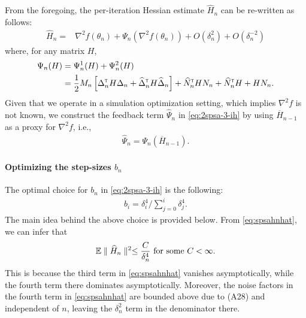 From the foregoing, the per-iteration Hessian estimate $\widehat H_n$ can be re-written as follows:
\begin{align}
\widehat H_n = & \nabla^2 f(\theta_n) + \Psi_{n}(\nabla^2 f(\theta_n)) +  O(\delta_n^2) + O(\delta_n^{-2})  \label{eq:spsahnhat}
\end{align}
where, for any matrix $H$, 
\begin{align}
\Psi_{n}(H) &=  \Psi_{n}^{1}(H) + \Psi_{n}^{2}(H)\nonumber\\
&=  \frac{1}{2}M_n \left[\Delta_n^\mathsf{\scriptscriptstyle T} H \Delta_n + \widehat\Delta_n^\mathsf{\scriptscriptstyle T} H \widehat\Delta_n\right] + \widehat N_n^\mathsf{\scriptscriptstyle T} H N_n + \widehat N_n^\mathsf{\scriptscriptstyle T} H + H N_n.\label{eq:spsapsi}
\end{align}
Given that we operate in a simulation optimization setting, which implies $\nabla^2 f$ is not known, we construct the feedback term $\widehat \Psi_n$ in \eqref{eq:2spsa-3-ih} by using $\overline H_{n-1}$ as a proxy for $\nabla^2 f$, i.e.,
\begin{align}
\widehat \Psi_n = \Psi_{n} (\overline H_{n-1}).
\label{eq:psinhatspsa3}
\end{align}

\paragraph{\textbf{Optimizing the step-sizes }$b_n$}

The optimal choice for $b_n$ in \eqref{eq:2spsa-3-ih}  is the following:
\begin{align}
\label{eq:spsawieghts}
b_i  = \delta_i^{4}/\sum\limits_{j=0}^{i} \delta_j^{4}.
\end{align}
The main idea behind the above choice is provided below.
From \eqref{eq:spsahnhat}, we can infer that
\begin{align*}
\mathbb{E} \parallel \widehat H_n \parallel^2 \le \dfrac{C}{\delta_n^4} \text{ for some } C<\infty. 
\end{align*} 
This is because the third term in \eqref{eq:spsahnhat} vanishes asymptotically, while the fourth term there dominates asymptotically. Moreover, the noise factors in the fourth term in \eqref{eq:spsahnhat} are bounded above due to (A28)  and independent of $n$, leaving the $\delta_n^2$ term in the denominator there. 

